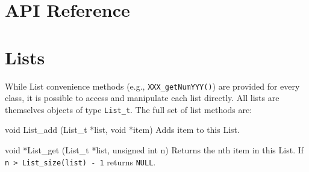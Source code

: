 \documentclass{cekmanual}
\begin{document}
\appendix
\section{API Reference}













































\section{Lists}
\label{app:lists}


While List convenience methods (e.g., \texttt{XXX\_getNumYYY()}) are
provided for every class, it is possible to access and manipulate each
list directly.  All lists are themselves objects of type
\texttt{List\_t}.  The full set of list methods are:


\begin{methoddef}{void List\_add (List\_t *list, void *item)}
  Adds item to this List.
\end{methoddef}

\begin{methoddef}{void *List\_get (List\_t *list, unsigned int n)}
  Returns the nth item in this List.  If \texttt{n > List\_size(list)
  - 1} returns \texttt{NULL}.
\end{methoddef}
\end{document}

